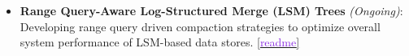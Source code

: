 \begin{itemize}\setlength\itemsep{0.4em}
	\item \textbf{Range Query-Aware Log-Structured Merge (LSM) Trees} \textit{(Ongoing)}: Developing range query driven compaction strategies to optimize overall system performance of LSM-based data stores.
	      \href{https://github.com/shubham-sudo/LSMQueryDrivenCompaction}{[\textcolor{blueviolet}{readme}]}



\end{itemize}
